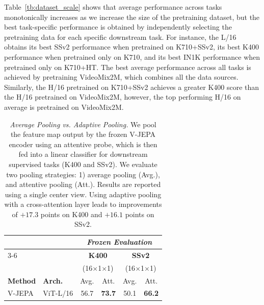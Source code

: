 \documentclass[twocolumn]{fairmeta}
\newcommand{\putalg}{{\small V-JEPA}\xspace}
\newcommand{\cc}{\cellcolor{metabg}}
\theoremstyle{plain}
\theoremstyle{definition}
\theoremstyle{remark}
\begin{document}
Table~\ref{tb:dataset_scale} shows that average performance across tasks monotonically increases as we increase the size of the pretraining dataset, but the best task-specific performance is obtained by independently selecting the pretraining data for each specific downstream task.
For instance, the L/16 obtains its best SSv2 performance when pretrained on K710+SSv2, its best K400 performance when pretrained only on K710, and its best IN1K performance when pretrained only on K710+HT. The best average performance across all tasks is achieved by pretraining  VideoMix2M, which combines all the data sources.
Similarly, the H/16 pretrained on K710+SSv2 achieves a greater K400 score than the H/16 pretrained on VideoMix2M, however, the top performing H/16 on average is pretrained on VideoMix2M.
\begin{table}[t]
    \centering
    {
    \fontsize{8.5pt}{8.5pt}\selectfont
    \caption{{\it Average Pooling vs. Adaptive Pooling.} 
    We pool the feature map output by the frozen \putalg encoder using an attentive probe, which is then fed into a linear classifier for downstream supervised tasks (K400 and SSv2).
    We evaluate two pooling strategies: 1) average pooling (Avg.), and attentive pooling (Att.).
    Results are reported using a single center view.
    Using adaptive pooling with a cross-attention layer leads to improvements of $+17.3$ points on K400 and $+16.1$ points on SSv2.}
    \label{tb:adaptive_feature_pooling}
    \begin{tabular}{ll cccc}
        \toprule
        & & \multicolumn{4}{c}{\it Frozen Evaluation} \\
        \cmidrule{3-6}
        & & \multicolumn{2}{c}{\bf K400} & \multicolumn{2}{c}{\bf SSv2}\\
        & & \multicolumn{2}{c}{{\fontsize{4.5pt}{4.5pt}\selectfont(16$\times$1$\times$1)}} & \multicolumn{2}{c}{{\fontsize{4.5pt}{4.5pt}\selectfont(16$\times$1$\times$1)}}\\
        \bf Method & \bf Arch. & Avg. & Att. & Avg. & Att.\\
        \midrule
        \putalg & ViT-L/16 & \cc 56.7 & \cc \bf 73.7 & \cc 50.1 & \cc \bf 66.2\\
        \bottomrule
    \end{tabular}}
\end{table}
\end{document}
